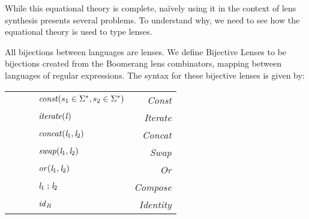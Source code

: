 \documentclass[numbers,10pt,preprint\ifanon ,nocopyrightspace\fi]{sigplanconf}
\begin{document}






While this equational theory is complete, na\"{i}vely using it in the
context of lens synthesis presents several problems.  To understand
why, we need to see how the equational theory is used to type lenses. 




All bijections between languages are lenses.  We define Bijective Lenses to be
bijections created from the Boomerang lens combinators, mapping between
languages of regular expressions.
The syntax for these bijective lenses is given by:
\begin{center}
  \begin{tabular}{l@{\ }l@{\ }c@{\ }l@{\ }>{\itshape\/}r}
    & \Lens{} & \GEq{} & $\ConstLensOf{s_1 \in \StarOf{\Alphabet}}{s_2 \in \StarOf{\Alphabet}}$ & Const \\
            & & & \GBar{} $\IterateLensOf{\Lens}$ & Iterate \\
            & & & \GBar{} $\ConcatLensOf{\Lens_1}{\Lens_2}$ & Concat \\
            & & & \GBar{} $\SwapLensOf{\Lens_1}{\Lens_2}$ & Swap\\
            & & & \GBar{} $\OrLensOf{\Lens_1}{\Lens_2}$ & Or\\
            & & & \GBar{} $\ComposeLensOf{\Lens_2}{\Lens_1}$ & Compose\\
            & & & \GBar{} $\IdentityLensOf{\Regex}$ & Identity
  \end{tabular}
\end{center}
\end{document}

